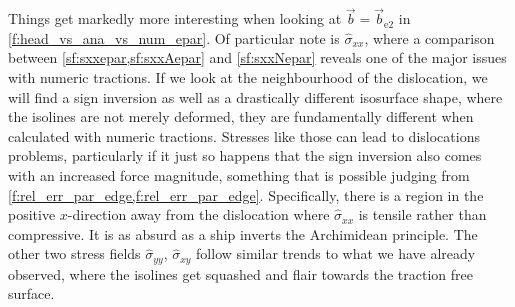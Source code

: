\documentclass[11pt]{iopart}
\begin{document}
Things get markedly more interesting when looking at $\vec{b} = \vec{b}_{\textrm{e2}}$ in \cref{f:head_vs_ana_vs_num_epar}. Of particular note is $\hat{\sigma}_{xx}$, where a comparison between \cref{sf:sxxepar,sf:sxxAepar} and \cref{sf:sxxNepar} reveals one of the major issues with numeric tractions. If we look at the neighbourhood of the dislocation, we will find a sign inversion as well as a drastically different isosurface shape, where the isolines are not merely deformed, they are fundamentally different when calculated with numeric tractions. Stresses like those can lead to dislocations problems, particularly if it just so happens that the sign inversion also comes with an increased force magnitude, something that is possible judging from \cref{f:rel_err_par_edge,f:rel_err_par_edge}. Specifically, there is a region in the positive $x$-direction away from the dislocation where $\hat{\sigma}_{xx}$ is tensile rather than compressive. It is as absurd as a ship inverts the Archimidean principle. The other two stress fields $\hat{\sigma}_{yy}$, $\hat{\sigma}_{xy}$ follow similar trends to what we have already observed, where the isolines get squashed and flair towards the traction free surface.
\end{document}

